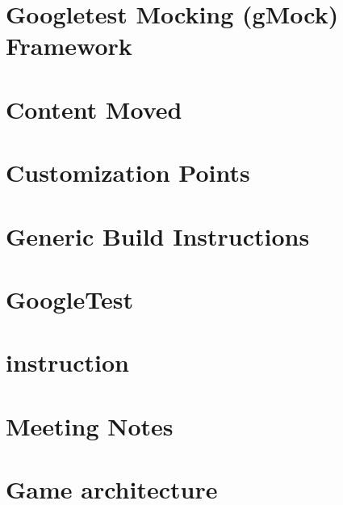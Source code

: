 \let\mypdfximage\pdfximage\def\pdfximage{\immediate\mypdfximage}\documentclass[twoside]{book}
\newcommand{\+}{\discretionary{\mbox{\scriptsize$\hookleftarrow$}}{}{}}
\begin{document}
\chapter{Googletest Mocking (g\+Mock) Framework}
\label{md_googletest_googlemock_README}

\chapter{Content Moved}
\label{md_googletest_googletest_docs_README}

\chapter{Customization Points}
\label{md_googletest_googletest_include_gtest_internal_custom_README}

\chapter{Generic Build Instructions}
\label{md_googletest_googletest_README}

\chapter{Google\+Test}
\label{md_googletest_README}

\chapter{instruction}
\label{md_meeting_notes_instruction}

\chapter{Meeting Notes}
\label{md_meeting_notes_Meeting_notes}

\chapter{Game architecture}
\label{md_meeting_notes_plan_game_architecture}

\end{document}
